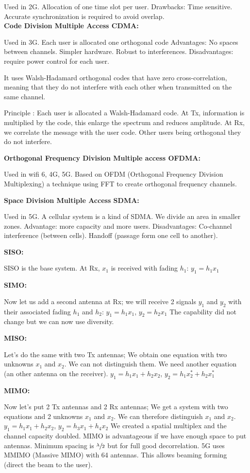 Used in 2G. Allocation of one time slot per user.
Drawbacks: Time sensitive. Accurate synchronization is required to avoid overlap.\\

\textbf{Code Division Multiple Access CDMA:}

Used in 3G. Each user is allocated one orthogonal
code Advantages: No spaces between channels. Simpler hardware. Robust to interferences.
Disadvantages: require power control for each user.

It uses Walsh-Hadamard orthogonal codes that have zero cross-correlation, meaning that
they do not interfere with each other when transmitted on the same channel.

Principle : Each user is allocated a Walsh-Hadamard code. At Tx, information is multiplied
by the code, this enlarge the spectrum and reduces amplitude. At Rx, we correlate the message
with the user code. Other users being orthogonal they do not interfere.

\textbf{Orthogonal Frequency Division Multiple access OFDMA:}

Used in wifi 6, 4G, 5G.
Based on OFDM (Orthogonal Frequency Division Multiplexing) a technique using FFT to create
orthogonal frequency channels.

\textbf{Space Division Multiple Access SDMA:}

Used in 5G. A cellular
system is a kind of SDMA. We divide an area in smaller zones. Advantage: more capacity and
more users. Disadvantages: Co-channel interference (between cells). Handoff (passage form one cell to another).

\textbf{SISO:}

SISO is the base system. At Rx, $x_1$ is received with fading $h_1$: $y_1=h_1x_1$

\textbf{SIMO:}

Now let us add a second antenna at Rx; we will receive 2 signals $y_1$ and $y_2$
with their associated fading $h_1$ and $h_2$: $y_1=h_1x_1$, $y_2=h_2x_1$ The capability did not
change but we can now use diversity.

\textbf{MISO:}

Let's do the same with two Tx antennas; We obtain
one equation with two unknowns $x_1$ and $x_2$. We can
not distinguish them. We need another equation (an other antenna on the receiver).
$y_1=h_1x_1+h_2x_2$, $y_2=h_1x_2^*+h_2x_1^*$

\textbf{MIMO:}

Now let's put 2 Tx antennas and 2 Rx antennas; We
get a system with two equations and 2 unknowns $x_1$
and $x_2$. We can therefore distinguish $x_1$ and $x_2$. $y_1=h_1x_1+h_2x_2$, $y_2=h_3x_1+h_4x_2$
We created a spatial multiplex and the channel capacity doubled.
MIMO is advantageous if we have enough space to put antennas. Minimum spacing is $\sfrac{\lambda}{2}$
but for full good decorrelation. 5G uses MMIMO (Massive MIMO) with 64 antennas. This allows
beaming forming (direct the beam to the user).




